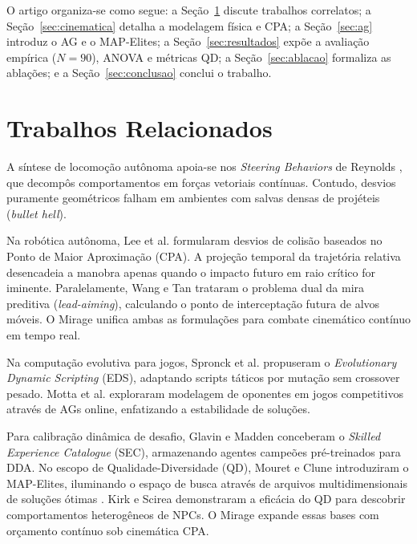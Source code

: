 \documentclass[10pt,conference,twocolumn]{article}
\begin{document}
O artigo organiza-se como segue: a Seção~\ref{sec:relacionados} discute trabalhos correlatos; a Seção~\ref{sec:cinematica} detalha a modelagem física e CPA; a Seção~\ref{sec:ag} introduz o AG e o MAP-Elites; a Seção~\ref{sec:resultados} expõe a avaliação empírica ($N = 90$), ANOVA e métricas QD; a Seção~\ref{sec:ablacao} formaliza as ablações; e a Seção~\ref{sec:conclusao} conclui o trabalho.

\section{Trabalhos Relacionados}
\label{sec:relacionados}
A síntese de locomoção autônoma apoia-se nos \textit{Steering Behaviors} de Reynolds \cite{reynolds1999steering}, que decompôs comportamentos em forças vetoriais contínuas. Contudo, desvios puramente geométricos falham em ambientes com salvas densas de projéteis (\textit{bullet hell}).

Na robótica autônoma, Lee et al. \cite{lee2014collision} formularam desvios de colisão baseados no Ponto de Maior Aproximação (CPA). A projeção temporal da trajetória relativa desencadeia a manobra apenas quando o impacto futuro em raio crítico for iminente. Paralelamente, Wang e Tan \cite{wang2014self} trataram o problema dual da mira preditiva (\textit{lead-aiming}), calculando o ponto de interceptação futura de alvos móveis. O Mirage unifica ambas as formulações para combate cinemático contínuo em tempo real.

Na computação evolutiva para jogos, Spronck et al. \cite{spronck2006adaptive} propuseram o \textit{Evolutionary Dynamic Scripting} (EDS), adaptando scripts táticos por mutação sem crossover pesado. Motta et al. \cite{motta2016online} exploraram modelagem de oponentes em jogos competitivos através de AGs online, enfatizando a estabilidade de soluções.

Para calibração dinâmica de desafio, Glavin e Madden \cite{glavin2015skilled} conceberam o \textit{Skilled Experience Catalogue} (SEC), armazenando agentes campeões pré-treinados para DDA. No escopo de Qualidade-Diversidade (QD), Mouret e Clune \cite{mouret2015illuminating} introduziram o MAP-Elites, iluminando o espaço de busca através de arquivos multidimensionais de soluções ótimas \cite{lehman2011abandoning, cully2015robots}. Kirk e Scirea \cite{kirk2020exploring} demonstraram a eficácia do QD para descobrir comportamentos heterogêneos de NPCs. O Mirage expande essas bases com orçamento contínuo sob cinemática CPA.
\end{document}
